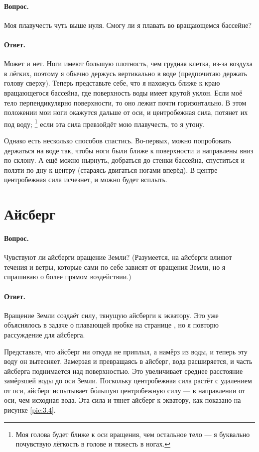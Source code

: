 \paragraph{Вопрос.}
Моя плавучесть чуть выше нуля. Смогу ли я плавать во вращающемся бассейне?

\paragraph{Ответ.}
Может и нет.
Ноги имеют большую плотность, чем грудная клетка, из-за воздуха в лёгких, поэтому я обычно держусь вертикально в воде (предпочитаю держать голову сверху).
Теперь представьте себе, что я нахожусь ближе к краю вращающегося бассейна, где поверхность воды имеет крутой уклон. Если моё тело перпендикулярно поверхности, то оно лежит почти горизонтально.
В этом положении мои ноги окажутся дальше от оси, и центробежная сила, потянет их под воду;%
\footnote{Моя голова будет ближе к оси вращения, чем остальное тело --- я буквально почувствую лёгкость в голове и тяжесть в ногах.}
если эта сила превзойдёт мою плавучесть, то я утону.

Однако есть несколько способов спастись.
Во-первых, можно попробовать держаться на воде так, чтобы ноги были ближе к поверхности и направлены вниз по склону.
А ещё можно нырнуть, добраться до стенки бассейна, спуститься и ползти по дну к центру (стараясь двигаться ногами вперёд).
В центре центробежная сила исчезнет, и можно будет всплыть.

\section{Айсберг}\label{sec:iceberg}

\paragraph{Вопрос.} Чувствуют ли айсберги вращение Земли?
(Разумеется, на айсберги влияют течения и ветры, которые сами по себе зависят от вращения Земли, но я спрашиваю о более прямом воздействии.)

\paragraph{Ответ.}
Вращение Земли создаёт силу, тянущую айсберги к экватору.
Это уже объяснялось в задаче о плавающей пробке на странице \pageref{sec:cork},
но я повторю рассуждение для айсберга.

Представьте, что айсберг ни откуда не приплыл, а намёрз из воды, и теперь эту воду он вытесняет.
Замерзая и превращаясь в айсберг, вода расширяется, и часть айсберга поднимается над поверхностью.
Это увеличивает среднее расстояние замёрзшей воды до оси Земли.
Поскольку центробежная сила растёт с удалением от оси, айсберг испытывает б\'{о}льшую центробежную силу — в направлении от оси, чем исходная вода.
Эта сила и тянет айсберг к экватору, как показано на рисунке \ref{pic:3.4}.

